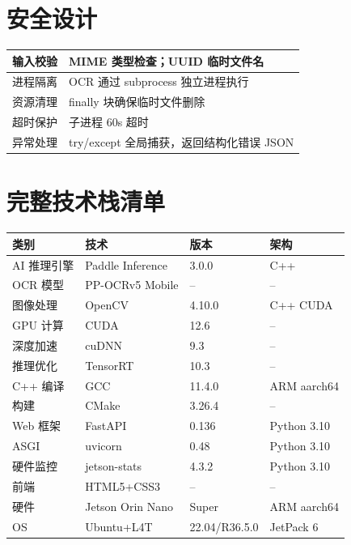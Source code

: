 \documentclass[12pt,a4paper]{ctexart}
\begin{document}
\section{安全设计}
\begin{longtable}{|p{3cm}|p{10cm}|}\hline
输入校验 & MIME 类型检查；UUID 临时文件名 \\\hline
进程隔离 & OCR 通过 subprocess 独立进程执行 \\\hline
资源清理 & finally 块确保临时文件删除 \\\hline
超时保护 & 子进程 60s 超时 \\\hline
异常处理 & try/except 全局捕获，返回结构化错误 JSON \\\hline
\end{longtable}

\appendix
\section{完整技术栈清单}
\begin{longtable}{|p{3cm}|p{5cm}|p{2.5cm}|p{2.5cm}|}\hline
\textbf{类别} & \textbf{技术} & \textbf{版本} & \textbf{架构} \\\hline
AI 推理引擎 & Paddle Inference & 3.0.0 & C++ \\\hline
OCR 模型 & PP-OCRv5 Mobile & -- & -- \\\hline
图像处理 & OpenCV & 4.10.0 & C++ CUDA \\\hline
GPU 计算 & CUDA & 12.6 & -- \\\hline
深度加速 & cuDNN & 9.3 & -- \\\hline
推理优化 & TensorRT & 10.3 & -- \\\hline
C++ 编译 & GCC & 11.4.0 & ARM aarch64 \\\hline
构建 & CMake & 3.26.4 & -- \\\hline
Web 框架 & FastAPI & 0.136 & Python 3.10 \\\hline
ASGI & uvicorn & 0.48 & Python 3.10 \\\hline
硬件监控 & jetson-stats & 4.3.2 & Python 3.10 \\\hline
前端 & HTML5+CSS3 & -- & -- \\\hline
硬件 & Jetson Orin Nano & Super & ARM aarch64 \\\hline
OS & Ubuntu+L4T & 22.04/R36.5.0 & JetPack 6 \\\hline
\end{longtable}
\end{document}
